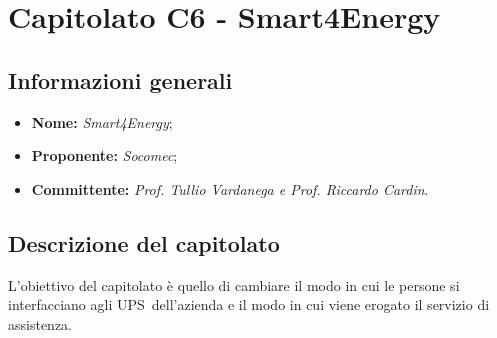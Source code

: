 \section{Capitolato C6 - Smart4Energy}\label{section:c6}

\subsection{Informazioni generali}
	\begin {itemize}
		\item \textbf{Nome:} \textit{Smart4Energy};
		\item \textbf{Proponente:} \textit{Socomec};
		\item \textbf{Committente:} \textit{Prof. Tullio Vardanega e Prof. Riccardo Cardin}.
	\end{itemize}

	\subsection{Descrizione del capitolato}
		L’obiettivo del capitolato è quello di cambiare il modo in cui le persone si interfacciano agli UPS\glo\ dell'azienda e il modo in cui viene erogato il servizio di assistenza.

